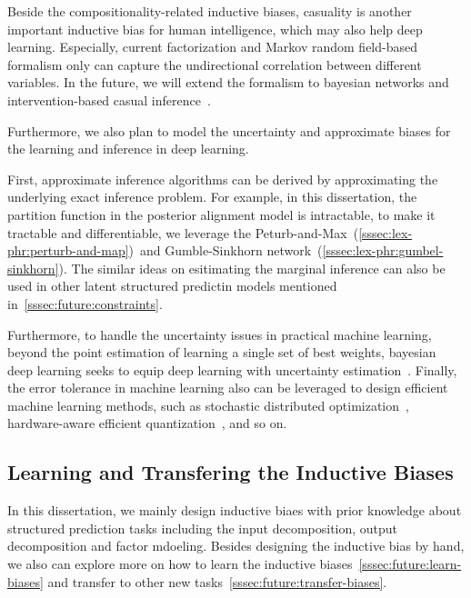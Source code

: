 Beside the compositionality-related inductive biases, casuality is
another important inductive bias for human intelligence, which may
also help deep learning. Especially, current factorization and Markov
random field-based formalism only can capture the undirectional
correlation between different variables. In the future, we will extend
the formalism to bayesian networks and intervention-based casual
inference~\citep{pearl2010causal,glymour2016causal}.

Furthermore, we also plan to model the uncertainty and approximate
biases for the learning and inference in deep learning.

First, approximate inference algorithms can be derived by
approximating the underlying exact inference problem. For example, in
this dissertation, the partition function in the posterior alignment
model is intractable, to make it tractable and differentiable, we
leverage the
Peturb-and-Max~(\autoref{sssec:lex-phr:perturb-and-map})~and
Gumble-Sinkhorn network~(\autoref{sssec:lex-phr:gumbel-sinkhorn}). The
similar ideas on esitimating the marginal inference can also be used
in other latent structured predictin models mentioned
in~\autoref{sssec:future:constraints}.

Furthermore, to handle the uncertainty issues in practical machine
learning, beyond the point estimation of learning a single set of best
weights, bayesian deep learning seeks to equip deep learning with
uncertainty estimation~\citep{wang2020survey}. Finally, the error
tolerance in machine learning also can be leveraged to design
efficient machine learning methods, such as stochastic distributed
optimization~\cite{assran2019stochastic}, hardware-aware efficient
quantization~\citep{huang2022sdq}, and so on.

\subsection{Learning and Transfering the Inductive Biases}
\label{ssec:future:bias-learn-transfer}
In this dissertation, we mainly design inductive biaes with prior knowledge
about structured prediction tasks including the input decomposition,
output decomposition and factor mdoeling. Besides designing the
inductive bias by hand, we also can explore more on how to learn the
inductive biases~\autoref{sssec:future:learn-biases} and transfer to
other new tasks~\autoref{sssec:future:transfer-biases}.

